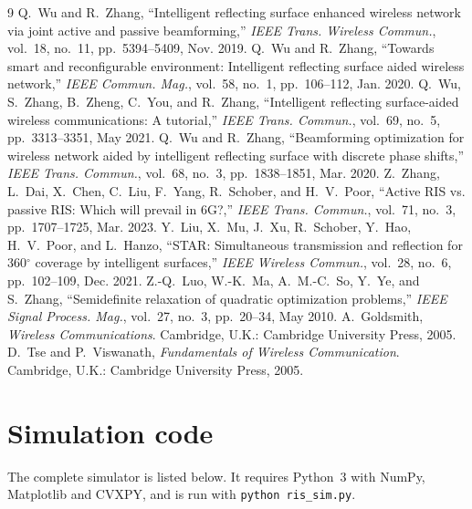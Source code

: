 \documentclass[11pt,a4paper]{article}
\begin{document}
\begin{thebibliography}{9}
 Q.~Wu and R.~Zhang, ``Intelligent reflecting surface enhanced wireless network via joint
active and passive beamforming,'' \emph{IEEE Trans. Wireless Commun.}, vol.~18, no.~11,
pp.~5394--5409, Nov. 2019.
 Q.~Wu and R.~Zhang, ``Towards smart and reconfigurable environment: Intelligent
reflecting surface aided wireless network,'' \emph{IEEE Commun. Mag.}, vol.~58, no.~1, pp.~106--112,
Jan. 2020.
 Q.~Wu, S.~Zhang, B.~Zheng, C.~You, and R.~Zhang, ``Intelligent reflecting
surface-aided wireless communications: A tutorial,'' \emph{IEEE Trans. Commun.}, vol.~69, no.~5,
pp.~3313--3351, May 2021.
 Q.~Wu and R.~Zhang, ``Beamforming optimization for wireless network aided by
intelligent reflecting surface with discrete phase shifts,'' \emph{IEEE Trans. Commun.}, vol.~68,
no.~3, pp.~1838--1851, Mar. 2020.
 Z.~Zhang, L.~Dai, X.~Chen, C.~Liu, F.~Yang, R.~Schober, and H.~V.~Poor,
``Active RIS vs. passive RIS: Which will prevail in 6G?,'' \emph{IEEE Trans. Commun.}, vol.~71, no.~3,
pp.~1707--1725, Mar. 2023.
 Y.~Liu, X.~Mu, J.~Xu, R.~Schober, Y.~Hao, H.~V.~Poor, and L.~Hanzo, ``STAR:
Simultaneous transmission and reflection for 360$^\circ$ coverage by intelligent surfaces,''
\emph{IEEE Wireless Commun.}, vol.~28, no.~6, pp.~102--109, Dec. 2021.
 Z.-Q.~Luo, W.-K.~Ma, A.~M.-C.~So, Y.~Ye, and S.~Zhang, ``Semidefinite relaxation of
quadratic optimization problems,'' \emph{IEEE Signal Process. Mag.}, vol.~27, no.~3, pp.~20--34,
May 2010.
 A.~Goldsmith, \emph{Wireless Communications}. Cambridge, U.K.: Cambridge
University Press, 2005.
 D.~Tse and P.~Viswanath, \emph{Fundamentals of Wireless Communication}. Cambridge, U.K.:
Cambridge University Press, 2005.
\end{thebibliography}

\appendix
\section{Simulation code}
\label{app:code}
The complete simulator is listed below. It requires Python~3 with NumPy, Matplotlib and CVXPY, and is
run with \texttt{python ris\_sim.py}.


\end{document}
